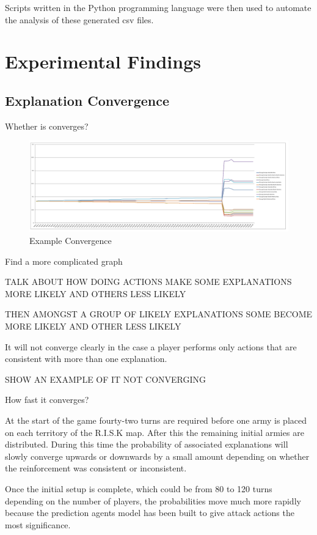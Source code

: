 \documentclass[parskip]{cs4rep}
\begin{document}
Scripts written in the Python programming language were then used to automate the analysis of these generated csv files.

\newpage

\section{Experimental Findings}

\subsection{Explanation Convergence}

Whether is converges?

\begin{figure}[h]
\centerline{
\includegraphics{images/example-good-convergence}
}
\caption{Example Convergence}
\label{fig:example-good-convergence}
\end{figure} 

Find a more complicated graph

TALK ABOUT HOW DOING ACTIONS MAKE SOME EXPLANATIONS MORE LIKELY AND OTHERS LESS LIKELY

THEN AMONGST A GROUP OF LIKELY EXPLANATIONS SOME BECOME MORE LIKELY AND OTHER LESS LIKELY

It will not converge clearly in the case a player performs only actions that are consistent with more than one explanation.

SHOW AN EXAMPLE OF IT NOT CONVERGING

How fast it converges?

At the start of the game fourty-two turns are required before one army is placed on each territory of the R.I.S.K map. After this the remaining initial armies are distributed. During this time the probability of associated explanations will slowly converge upwards or downwards by a small amount depending on whether the reinforcement was consistent or inconsistent.

Once the initial setup is complete, which could be from 80 to 120 turns depending on the number of players, the probabilities move much more rapidly because the prediction agents model has been built to give attack actions the most significance.
\end{document}
